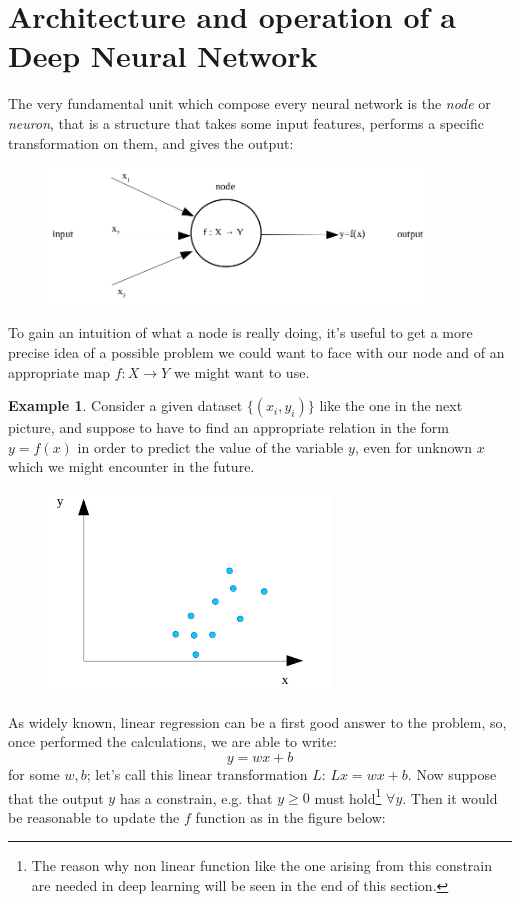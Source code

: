 \documentclass[12pt, a4paper]{report}
\theoremstyle{definition}
\newtheorem{Example}{Example}
\begin{document}
{\section{Architecture and operation of a Deep Neural Network}\label{section1.1}
The very fundamental unit which compose every neural network is the \textit{node} or \textit{neuron}, that is a structure that takes some input features, performs a specific transformation on them, and gives the output:
\begin{figure}[H]
\centering
\includegraphics[width=10cm]{img/node}
\caption{}\label{fig1}
\end{figure}
\noindent To gain an intuition of what a node is really doing, it's useful to get a more precise idea of a possible problem we could want to face with our node and of an appropriate map $f:X\rightarrow Y$ we might want to use.
\begin{Example}\label{example1}
Consider a given dataset $\{(x_i,y_i)\}$ like the one in the next picture, and suppose to have to find an appropriate relation in the form $y=f(x)$ in order to predict the value of the variable $y$, even for unknown $x$ which we might encounter in the future.
\begin{figure}[H]
	\centering
	\includegraphics[width=7.5cm]{img/regression1}
	\caption{}
\end{figure}
\noindent As widely known, linear regression can be a first good answer to the problem, so, once performed the calculations, we are able to write:
\[
y=wx + b
\]
for some $w,b$; let's call this linear transformation $L\!: \, Lx=wx+b$. Now suppose that the output $y$ has a constrain, e.g. that $y\ge0$ must hold\footnote{The reason why non linear function like the one arising from this constrain are needed in deep learning will be seen in the end of this section.} $ \forall y $. Then it would be reasonable to update the $f$ function as in the figure below:

\end{Example}}
\end{document}
